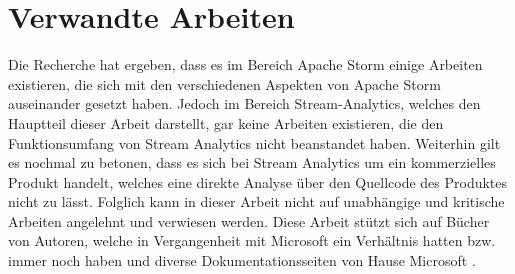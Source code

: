 \section{Verwandte Arbeiten}

Die Recherche hat ergeben, dass es im Bereich Apache Storm einige Arbeiten existieren, die sich mit den verschiedenen Aspekten von Apache Storm auseinander gesetzt haben. Jedoch im Bereich Stream-Analytics, welches den Hauptteil dieser Arbeit darstellt, gar keine Arbeiten existieren, die den Funktionsumfang von Stream Analytics nicht beanstandet haben. Weiterhin gilt es nochmal zu betonen, dass es sich bei Stream Analytics um ein kommerzielles Produkt handelt, welches eine direkte Analyse über den Quellcode des Produktes nicht zu lässt. Folglich kann in dieser Arbeit nicht auf unabhängige und kritische Arbeiten angelehnt und verwiesen werden. Diese Arbeit stützt sich auf Bücher von Autoren, welche in Vergangenheit mit Microsoft ein Verhältnis hatten bzw. immer noch haben und diverse Dokumentationsseiten von Hause Microsoft \cite{Familiar.2017} \cite{Klein.2017}. 